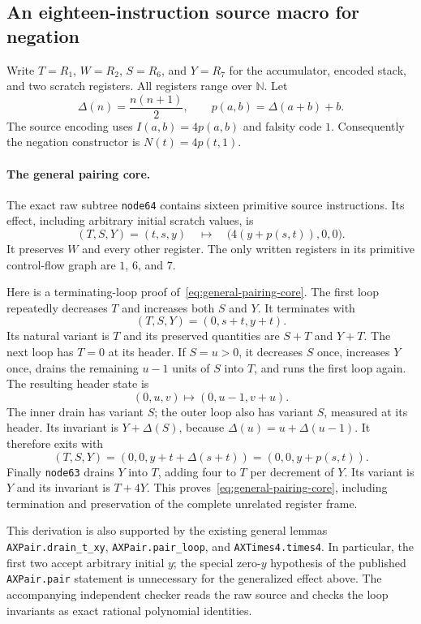 \subsection{An eighteen-instruction source macro for negation}
\label{sec:negation18}

Write $T=R_1$, $W=R_2$, $S=R_6$, and $Y=R_7$ for the accumulator,
encoded stack, and two scratch registers. All registers range over
$\mathbb N$. Let
\[
 \Delta(n)=\frac{n(n+1)}2,\qquad
 p(a,b)=\Delta(a+b)+b.
\]
The source encoding uses $I(a,b)=4p(a,b)$ and falsity code $1$.
Consequently the negation constructor is $N(t)=4p(t,1)$.

\paragraph{The general pairing core.}
The exact raw subtree \texttt{node64} contains sixteen primitive source
instructions. Its effect, including arbitrary initial scratch values, is
\begin{equation}
 (T,S,Y)=(t,s,y)
 \quad\longmapsto\quad
 \bigl(4(y+p(s,t)),0,0\bigr).
 \label{eq:general-pairing-core}
\end{equation}
It preserves $W$ and every other register. The only written registers in
its primitive control-flow graph are $1$, $6$, and $7$.

Here is a terminating-loop proof of~\eqref{eq:general-pairing-core}.
The first loop repeatedly decreases $T$ and increases both $S$ and $Y$.
It terminates with
\[
 (T,S,Y)=(0,s+t,y+t).
\]
Its natural variant is $T$ and its preserved quantities are $S+T$ and
$Y+T$. The next loop has $T=0$ at its header. If $S=u>0$, it decreases
$S$ once, increases $Y$ once, drains the remaining $u-1$ units of $S$
into $T$, and runs the first loop again. The resulting header state is
\[
 (0,u,v)\longmapsto(0,u-1,v+u).
\]
The inner drain has variant $S$; the outer loop also has variant $S$,
measured at its header. Its invariant is $Y+\Delta(S)$, because
$\Delta(u)=u+\Delta(u-1)$. It therefore exits with
\[
 (T,S,Y)=(0,0,y+t+\Delta(s+t))=(0,0,y+p(s,t)).
\]
Finally \texttt{node63} drains $Y$ into $T$, adding four to $T$ per
decrement of $Y$. Its variant is $Y$ and its invariant is $T+4Y$.
This proves~\eqref{eq:general-pairing-core}, including termination and
preservation of the complete unrelated register frame.

This derivation is also supported by the existing general lemmas
\texttt{AXPair.drain\_t\_xy}, \texttt{AXPair.pair\_loop}, and
\texttt{AXTimes4.times4}. In particular, the first two accept arbitrary
initial $y$; the special zero-$y$ hypothesis of the published
\texttt{AXPair.pair} statement is unnecessary for the generalized effect
above. The accompanying independent checker reads the raw source and
checks the loop invariants as exact rational polynomial identities.

